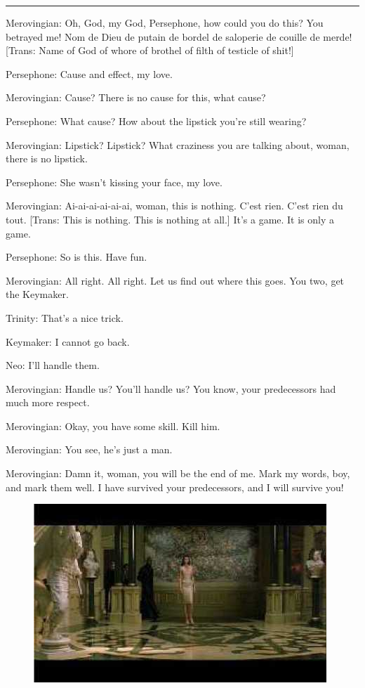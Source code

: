 \documentclass[UTF8]{ctexart}
\newcommand{\myparsep}{\noindent \rule[0.5ex]{\linewidth}{1pt}}
\newenvironment{myquote}{\color{green} \setlength{\leftskip}{6em} \setlength{\rightskip}{4em} \setlength{\parindent}{-2em}}{\par}
\begin{document}
\myparsep

\begin{myquote}
Merovingian: Oh, God, my God, Persephone, how could you do this? You betrayed me! Nom de Dieu de putain de bordel de saloperie de couille de merde! [Trans: Name of God of whore of brothel of filth of testicle of shit!]

Persephone: Cause and effect, my love.

Merovingian: Cause? There is no cause for this, what cause?

Persephone: What cause? How about the lipstick you're still wearing?

Merovingian: Lipstick? Lipstick? What craziness you are talking about, woman, there is no lipstick.

Persephone: She wasn't kissing your face, my love.

Merovingian: Ai-ai-ai-ai-ai-ai, woman, this is nothing. C'est rien. C'est rien du tout. [Trans: This is nothing. This is nothing at all.] It's a game. It is only a game.

Persephone: So is this. Have fun.

Merovingian: All right. All right. Let us find out where this goes. You two, get the Keymaker.

Trinity: That's a nice trick.

Keymaker: I cannot go back.

Neo: I'll handle them.

Merovingian: Handle us? You'll handle us? You know, your predecessors had much more respect.

Merovingian: Okay, you have some skill. Kill him.

Merovingian: You see, he's just a man.

Merovingian: Damn it, woman, you will be the end of me. Mark my words, boy, and mark them well. I have survived your predecessors, and I will survive you!
\end{myquote}

\begin{figure}[htb]
\centering
\includegraphics[width=0.5\linewidth]{fig/read_reloaded-116}
\end{figure}
\end{document}

